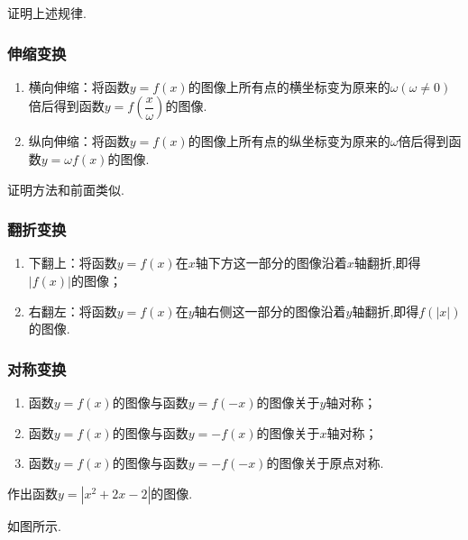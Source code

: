 \documentclass[lang=cn,math=cm,chinesefont=nofont,11pt,scheme=chinese,twocol]{elegantbook}
\begin{document}
\begin{exercise}
  证明上述规律.
\end{exercise}

\subsubsection{伸缩变换}

\begin{enumerate}
  \item 横向伸缩：将函数$y=f(x)$的图像上所有点的横坐标变为原来的$\omega(\omega\neq 0)$倍后得到函数$y=f(\dfrac{x}{\omega})$的图像.
  \item 纵向伸缩：将函数$y=f(x)$的图像上所有点的纵坐标变为原来的$\omega$倍后得到函数$y=\omega f(x)$的图像.
\end{enumerate}

证明方法和前面类似.

\subsubsection{翻折变换}

\begin{enumerate}
  \item 下翻上：将函数$y=f(x)$在$x$轴下方这一部分的图像沿着$x$轴翻折,即得$\left| f(x)\right|$的图像；
  \item 右翻左：将函数$y=f(x)$在$y$轴右侧这一部分的图像沿着$y$轴翻折,即得$f(\left| x\right|)$的图像.
\end{enumerate}

\subsubsection{对称变换}

\begin{enumerate}
  \item 函数$y=f(x)$的图像与函数$y=f(-x)$的图像关于$y$轴对称；
  \item 函数$y=f(x)$的图像与函数$y=-f(x)$的图像关于$x$轴对称；
  \item 函数$y=f(x)$的图像与函数$y=-f(-x)$的图像关于原点对称.
\end{enumerate}

\begin{example}
  作出函数$y=\left| x^2+2x-2\right|$的图像.
\end{example}

\begin{solution}
  如图所示.
\end{solution}
\end{document}
